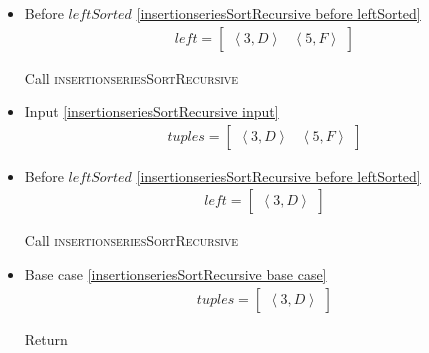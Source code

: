 \begin{frame}[containsverbatim]{\insertionseriesexampleframe}
\begin{columns}[c]
\begin{column}{0.6\textwidth}
{\begin{minipage}[c]{\textwidth}
\begin{multicols}{3}
\begin{itemize}
                                    \item Before $leftSorted$ \cref{insertionseriesSortRecursive before leftSorted}
                                    \begin{align*}
                                        left = \begin{bmatrix}\left<3, D\right> & \left<5, F\right>\end{bmatrix}
                                    \end{align*}
        
                                    Call \textsc{insertionseriesSortRecursive}
            
                                    \item Input \cref{insertionseriesSortRecursive input}
                                    \begin{align*}
                                        tuples = \begin{bmatrix}\left<3, D\right> & \left<5, F\right>\end{bmatrix}
                                    \end{align*}
            
                                    \item Before $leftSorted$ \cref{insertionseriesSortRecursive before leftSorted}
                                    \begin{align*}
                                        left = \begin{bmatrix}\left<3, D\right>\end{bmatrix}
                                    \end{align*}
        
                                    Call \textsc{insertionseriesSortRecursive}
            
                                    \item Base case \cref{insertionseriesSortRecursive base case}
                                    \begin{align*}
                                        tuples = \begin{bmatrix}\left<3, D\right>\end{bmatrix}
                                    \end{align*}
        
                                    Return
            

\end{itemize}
\end{multicols}
\end{minipage}}
\end{column}
\end{columns}
\end{frame}
